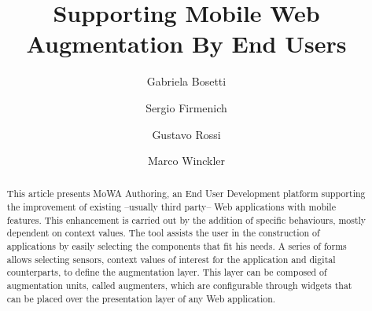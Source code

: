 \documentclass[runningheads]{llncs}
\begin{document}
%
\title{Supporting Mobile Web Augmentation By End Users}
%
% 
\author{Gabriela Bosetti \and Sergio Firmenich \and Gustavo Rossi \and Marco Winckler}

%
%
\maketitle              %
%
\begin{abstract}
This article presents MoWA Authoring, an End User Development platform supporting the improvement of existing –usually third party– Web applications with mobile features. This enhancement is carried out by the addition of specific behaviours, mostly dependent on context values. The tool assists the user in the construction of applications by easily selecting the components that fit his needs. A series of forms allows selecting sensors, context values of interest for the application and digital counterparts, to define the augmentation layer. This layer can be composed of augmentation units, called augmenters, which are configurable through widgets that can be placed over the presentation layer of any Web application. 

\end{abstract}
%
\end{document}

